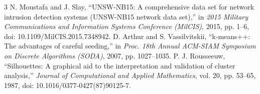 \documentclass[conference]{IEEEtran}
\begin{document}
\begin{thebibliography}{3}
 N. Moustafa and J. Slay, ``UNSW-NB15: A comprehensive data set for network intrusion detection systems (UNSW-NB15 network data set),'' in \emph{2015 Military Communications and Information Systems Conference (MilCIS)}, 2015, pp. 1--6, doi: 10.1109/MilCIS.2015.7348942.
 D. Arthur and S. Vassilvitskii, ``k-means++: The advantages of careful seeding,'' in \emph{Proc. 18th Annual ACM-SIAM Symposium on Discrete Algorithms (SODA)}, 2007, pp. 1027--1035.
 P. J. Rousseeuw, ``Silhouettes: A graphical aid to the interpretation and validation of cluster analysis,'' \emph{Journal of Computational and Applied Mathematics}, vol. 20, pp. 53--65, 1987, doi: 10.1016/0377-0427(87)90125-7.
\end{thebibliography}
\end{document}
